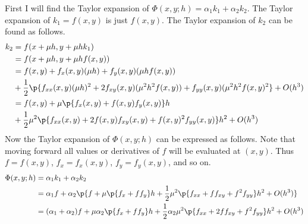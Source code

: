 \documentclass[11pt]{article}
\begin{document}
\begin{enumerate}
\begin{enumerate}
                First I will find the Taylor expansion of
                $\Phi(x, y; h) = \alpha_1 k_1 + \alpha_2 k_2$.
                The Taylor expansion of $k_1 = f(x,y)$ is just $f(x,y)$.
                The Taylor expansion of $k_2$ can be found as follows.
                \begin{align*}
                    k_2 &= f(x + \mu h, y + \mu h k_1) \\
                    &= f(x + \mu h, y + \mu h f(x,y)) \\
                    &= f(x,y) + f_x(x, y)(\mu h) + f_y(x,y)(\mu h f(x,y)) \\
                        &+ \frac{1}{2}\p{f_{xx}(x,y) (\mu h)^2 + 2f_{xy}(x,y)(\mu^2 h^2 f(x,y))
                        + f_{yy}(x,y)(\mu^2 h^2 f(x,y)^2} + O(h^3) \\
                    &= f(x,y) + \mu \p{f_x(x,y) + f(x,y) f_y(x,y)} h \\
                        &+\frac{1}{2} \mu^2 \p{f_{xx}(x,y) + 2 f(x,y) f_{xy}(x,y) + f(x,y)^2 f_{yy}(x,y)} h^2
                        + O(h^3) \\
                \end{align*}
                Now the Taylor expansion of $\Phi(x, y; h)$ can be expressed as follows.
                Note that moving forward all values or derivatives of $f$ will be
                evaluated at $(x,y)$.
                Thus $f = f(x,y)$, $f_x = f_x(x,y)$, $f_y = f_y(x,y)$, and so on.
                \begin{align*}
                    \Phi(x,y;h) &= \alpha_1 k_1 + \alpha_2 k_2 \\
                    &= \alpha_1 f + \alpha_2 \p{f + \mu \p{f_x + f f_y} h +
                        \frac{1}{2} \mu^2 \p{f_{xx} + f f_{xy} + f^2 f_{yy}} h^2 + O(h^3)} \\
                    &= (\alpha_1 + \alpha_2) f + \mu \alpha_2 \p{f_x + f f_y} h + 
                        \frac{1}{2} \alpha_2 \mu^2 \p{f_{xx} + 2f f_{xy} + f^2 f_{yy}} h^2 + O(h^3)
                \end{align*}


\end{enumerate}
\end{enumerate}
\end{document}
